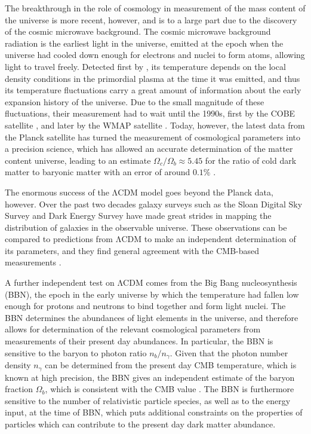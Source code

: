 \documentclass[b5paper, 10pt, twoside]{book}
\begin{document}
The breakthrough in the role of cosmology in measurement of the mass content of the universe is more recent, however, and is to a large part due to the discovery of the cosmic microwave background. The cosmic microwave background radiation is the earliest light in the universe, emitted at the epoch when the universe had cooled down enough for electrons and nuclei to form atoms, allowing light to travel freely. Detected first by \textcite{PenziasWilson1965}, its temperature depends on the local density conditions in the primordial plasma at the time it was emitted, and thus its temperature fluctuations carry a great amount of information about the early expansion history of the universe. Due to the small magnitude of these fluctuations, their measurement had to wait until the 1990s, first by the COBE satellite \parencite{BennettEtAl1996}, and later by the WMAP satellite \parencite{BennettEtAl2013}. Today, however, the latest data from the Planck satellite has turned the measurement of cosmological parameters into a precision science, which has allowed an accurate determination of the matter content universe, leading to an estimate $\Omega_c/\Omega_b\approx 5.45$ for the ratio of cold dark matter to baryonic matter with an error of around $0.1\%$ \parencite{Planck2018}.

The enormous success of the ΛCDM model goes beyond the Planck data, however. Over the past two decades galaxy surveys such as the Sloan Digital Sky Survey \parencite{SDSSIV2022} and Dark Energy Survey \parencite{DES2018} have made great strides in mapping the distribution of galaxies in the observable universe. These observations can be compared to predictions from ΛCDM to make an independent determination of its parameters, and they find general agreement with the CMB-based measurements \parencite{eBOSS2021}.

A further independent test on ΛCDM comes from the Big Bang nucleosynthesis (BBN), the epoch in the early universe by which the temperature had fallen low enough for protons and neutrons to bind together and form light nuclei. The BBN determines the abundances of light elements in the universe, and therefore allows for determination of the relevant cosmological parameters from measurements of their present day abundances. In particular, the BBN is sensitive to the baryon to photon ratio $n_b/n_\gamma$. Given that the photon number density $n_\gamma$ can be determined from the present day CMB temperature, which is known at high precision, the BBN gives an independent estimate of the baryon fraction $\Omega_b$, which is consistent with the CMB value \parencite{FieldsEtAl2020}. The BBN is furthermore sensitive to the number of relativistic particle species, as well as to the energy input, at the time of BBN, which puts additional constraints on the properties of particles which can contribute to the present day dark matter abundance.
\end{document}

